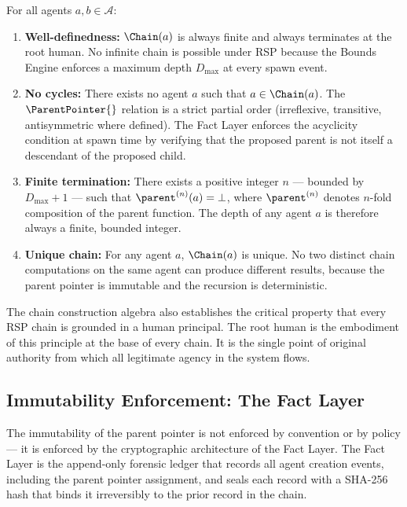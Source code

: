 \begin{property}
\label{prop:chain_properties}
For all agents $a, b \in \mathcal{A}$:
\begin{enumerate}
    \item \textbf{Well-definedness:} $\Chain(a)$ is always finite and always terminates at the root human. No infinite chain is possible under RSP because the Bounds Engine enforces a maximum depth $D_{\max}$ at every spawn event.

    \item \textbf{No cycles:} There exists no agent $a$ such that $a \in \Chain(a)$. The $\ParentPointer{}$ relation is a strict partial order (irreflexive, transitive, antisymmetric where defined). The Fact Layer enforces the acyclicity condition at spawn time by verifying that the proposed parent is not itself a descendant of the proposed child.

    \item \textbf{Finite termination:} There exists a positive integer $n$ — bounded by $D_{\max} + 1$ — such that $\parent^{(n)}(a) = \bot$, where $\parent^{(n)}$ denotes $n$-fold composition of the parent function. The depth of any agent $a$ is therefore always a finite, bounded integer.

    \item \textbf{Unique chain:} For any agent $a$, $\Chain(a)$ is unique. No two distinct chain computations on the same agent can produce different results, because the parent pointer is immutable and the recursion is deterministic.
\end{enumerate}
\end{property}

The chain construction algebra also establishes the critical property that every RSP chain is grounded in a human principal. The root human is the embodiment of this principle at the base of every chain. It is the single point of original authority from which all legitimate agency in the system flows.

\subsection{Immutability Enforcement: The Fact Layer}
\label{sec:fact_layer_immutability}

The immutability of the parent pointer is not enforced by convention or by policy — it is enforced by the cryptographic architecture of the Fact Layer. The Fact Layer is the append-only forensic ledger that records all agent creation events, including the parent pointer assignment, and seals each record with a SHA-256 hash that binds it irreversibly to the prior record in the chain.

